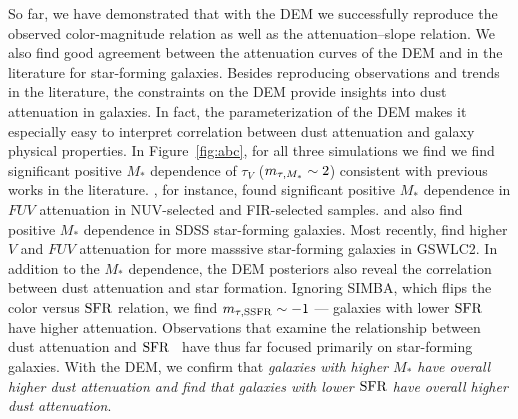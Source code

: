 So far, we have demonstrated that with the DEM we successfully reproduce the 
observed color-magnitude relation as well as the attenuation--slope relation.
We also find good agreement between the attenuation curves of the DEM and in
the literature for star-forming galaxies. Besides reproducing observations and
trends in the literature, the constraints on the DEM provide insights into dust
attenuation in galaxies. In fact, the parameterization of the DEM makes it
especially easy to interpret correlation between dust attenuation and galaxy
physical properties. In Figure~\ref{fig:abc}, for all three simulations we find
we find significant positive $M_*$ dependence of $\tau_V$ ($m_{\tau,M_*} \sim 2$) 
consistent with previous works in the literature. \cite{burgarella2005}, for instance, found significant
positive $M_*$ dependence in $FUV$ attenuation in NUV-selected and FIR-selected
samples. \cite{garn2010} and \cite{battisti2016} also find positive $M_*$ 
dependence in SDSS star-forming galaxies. Most recently, \cite{salim2018} 
find higher $V$ and $FUV$ attenuation for more masssive star-forming galaxies
in GSWLC2. In addition to the $M_*$ dependence, the DEM posteriors also reveal the
correlation between dust attenuation and star formation. Ignoring SIMBA, which
flips the color versus ${\rm SFR}$ relation, we find $m_{\tau,{\rm SSFR}}\sim-1$ --- galaxies 
with lower ${\rm SFR}$ have higher attenuation. Observations that examine the
relationship between dust attenuation and ${\rm SFR}$~\citep[\eg][]{garn2010,
reddy2015, battisti2016, battisti2017, salim2018} have thus far focused
primarily on star-forming galaxies. With the DEM, we confirm that 
\emph{galaxies with higher $M_*$ have overall higher dust attenuation
and find that galaxies with lower ${\rm SFR}$ have overall higher dust attenuation}. 





